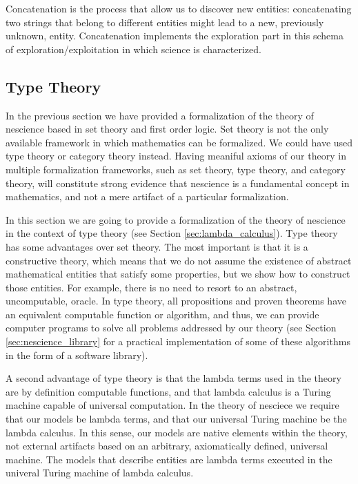 Concatenation is the process that allow us to discover new entities: concatenating two strings
that belong to different entities might lead to a new, previously unknown, entity. Concatenation
implements the exploration part in this schema of exploration/exploitation in which science is
characterized.

%
%

\subsection{Type Theory}

In the previous section we have provided a formalization of the theory of nescience based in set theory and first order logic. Set theory is not the only available framework in which mathematics can be formalized. We could have used type theory or category theory instead. Having meaniful axioms of our theory in multiple formalization frameworks, such as set theory, type theory, and category theory, will constitute strong evidence that nescience is a fundamental concept in mathematics, and not a mere artifact of a particular formalization.

In this section we are going to provide a formalization of the theory of nescience in the context of type theory (see Section \ref{sec:lambda_calculus}). Type theory has some advantages over set theory. The most important is that it is a constructive theory, which means that we do not assume the existence of abstract mathematical entities that satisfy some properties, but we show how to construct those entities. For example, there is no need to resort to an abstract, uncomputable, oracle. In type theory, all propositions and proven theorems have an equivalent computable function or algorithm, and thus, we can provide computer programs to solve all problems addressed by our theory (see Section \ref{sec:nescience_library} for a practical implementation of some of these algorithms in the form of a software library).

A second advantage of type theory is that the lambda terms used in the theory are by definition computable functions, and that lambda calculus is a Turing machine capable of universal computation. In the theory of nesciece we require that our models be lambda terms, and that our universal Turing machine be the lambda calculus. In this sense, our models are native elements within the theory, not external artifacts based on an arbitrary, axiomatically defined, universal machine. The models that describe entities are lambda terms executed in the univeral Turing machine of lambda calculus.

